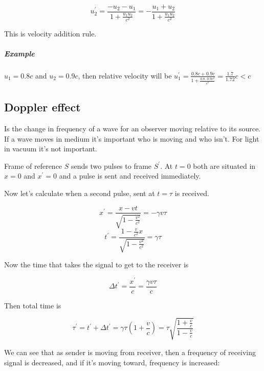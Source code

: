  $$u_{2}^\prime = \frac{-u_2-u_1}{1 + \frac{u_1u_2}{c^2}}=- \frac{u_1+u_2}{1+ \frac{u_1u_2}{c^2}}$$
 
 This is velocity addition rule.
 
 \subparagraph{Example} $u_1=0.8c$ and $u_2=0.9c$, then relative velocity will be  $u_1^\prime = \frac{0.8c+0.9c}{1+ \frac{0.8\cdot0.9c^2}{c^2}} = \frac{1.7}{1.72}c < c$
 
 
 \subsection{Doppler effect}
 
 Is the change in frequency of a wave for an observer moving relative to its source. If a wave moves in medium it's important who is moving and who isn't. For light in vacuum it's not important.
 
 Frame of reference $S$ sends two pulses to frame $S^\prime$. At $t=0$ both are situated in $x=0$ and $x^\prime=0$ and a pulse is sent and received immediately.
 
 Now let's calculate when a second pulse, sent at $t=\tau$ is received.
 
 $$x^\prime = \frac{x-vt}{\sqrt{1-\frac{v^2}{c^2}}} =-\gamma v \tau$$
 $$t^\prime = \frac{1 - \frac{v}{c^2}x}{\sqrt{1-\frac{v^2}{c^2}}} = \gamma \tau$$
 
 Now the time that takes the signal to get to the receiver is
 
 $$\Delta t^\prime=\frac{x^\prime}{c} = \frac{\gamma v \tau}{c}$$
 
 Then total time is
 
 $$\tau^\prime = t^\prime + \Delta t^\prime = \gamma \tau \left( 1  +\frac{v}{c}\right) =
  \tau \sqrt{\frac{1+\frac{v}{c}}{1-\frac{v}{c}}}$$
  
  We can see that as sender is moving from receiver, then a frequency of receiving signal is decreased, and if it's moving toward, frequency is increased:
